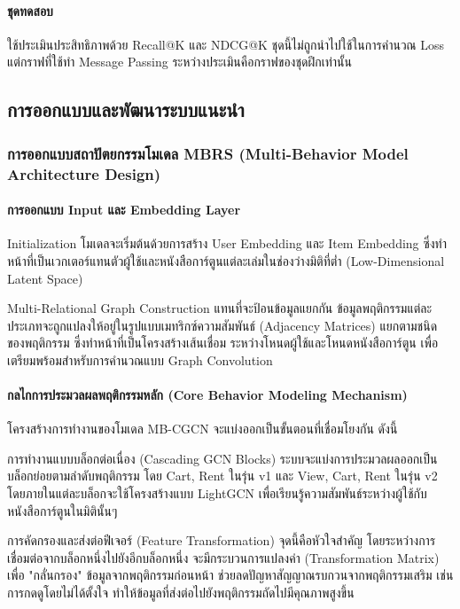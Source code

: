 \paragraph{ชุดทดสอบ}
ใช้ประเมินประสิทธิภาพด้วย Recall@K และ NDCG@K ชุดนี้ไม่ถูกนำไปใช้ในการคำนวณ Loss แต่กราฟที่ใช้ทำ Message Passing ระหว่างประเมินคือกราฟของชุดฝึกเท่านั้น

\subsection{การออกแบบและพัฒนาระบบแนะนำ}

\subsubsection{การออกแบบสถาปัตยกรรมโมเดล MBRS (Multi-Behavior Model Architecture Design)}

\paragraph{การออกแบบ Input และ Embedding Layer}

Initialization โมเดลจะเริ่มต้นด้วยการสร้าง User Embedding และ Item Embedding ซึ่งทำหน้าที่เป็นเวกเตอร์แทนตัวผู้ใช้และหนังสือการ์ตูนแต่ละเล่มในช่องว่างมิติที่ต่ำ (Low-Dimensional Latent Space)

Multi-Relational Graph Construction แทนที่จะป้อนข้อมูลแยกกัน ข้อมูลพฤติกรรมแต่ละประเภทจะถูกแปลงให้อยู่ในรูปแบบเมทริกซ์ความสัมพันธ์ (Adjacency Matrices) แยกตามชนิดของพฤติกรรม ซึ่งทำหน้าที่เป็นโครงสร้างเส้นเชื่อม ระหว่างโหนดผู้ใช้และโหนดหนังสือการ์ตูน เพื่อเตรียมพร้อมสำหรับการคำนวณแบบ Graph Convolution

\paragraph{กลไกการประมวลผลพฤติกรรมหลัก (Core Behavior Modeling Mechanism)}
โครงสร้างการทำงานของโมเดล MB-CGCN จะแบ่งออกเป็นขั้นตอนที่เชื่อมโยงกัน ดังนี้

การทำงานแบบบล็อกต่อเนื่อง (Cascading GCN Blocks) ระบบจะแบ่งการประมวลผลออกเป็นบล็อกย่อยตามลำดับพฤติกรรม โดย Cart, Rent ในรุ่น v1 และ View, Cart, Rent ในรุ่น v2 โดยภายในแต่ละบล็อกจะใช้โครงสร้างแบบ LightGCN เพื่อเรียนรู้ความสัมพันธ์ระหว่างผู้ใช้กับหนังสือการ์ตูนในมิตินั้นๆ

การคัดกรองและส่งต่อฟีเจอร์ (Feature Transformation) จุดนี้คือหัวใจสำคัญ โดยระหว่างการเชื่อมต่อจากบล็อกหนึ่งไปยังอีกบล็อกหนึ่ง จะมีกระบวนการแปลงค่า (Transformation Matrix) เพื่อ "กลั่นกรอง" ข้อมูลจากพฤติกรรมก่อนหน้า ช่วยลดปัญหาสัญญาณรบกวนจากพฤติกรรมเสริม เช่น การกดดูโดยไม่ได้ตั้งใจ ทำให้ข้อมูลที่ส่งต่อไปยังพฤติกรรมถัดไปมีคุณภาพสูงขึ้น

